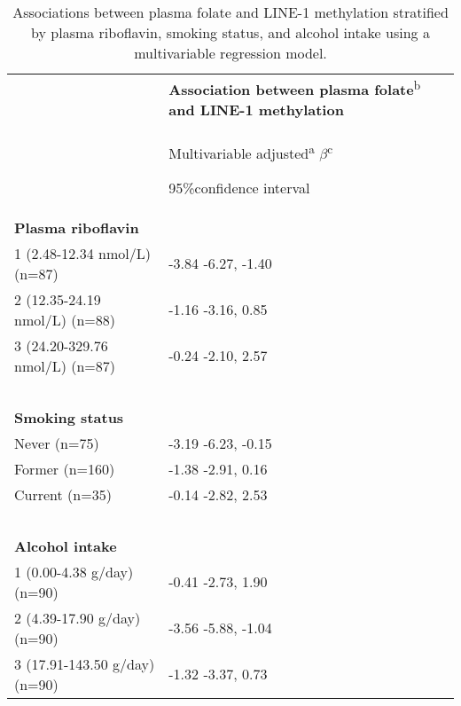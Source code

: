 \begin{table}
\caption{Associations between plasma folate and LINE-1 methylation stratified by plasma riboflavin, smoking status, and alcohol intake using a multivariable regression model.}
\label{table5_5}
\begin{adjustbox}{width=\textwidth}
\begin{tabular}{L{5.5cm}C{6.5cm}}

\hline ~ & %
\textbf{Association between plasma folate}\textsuperscript{b}
\textbf{and LINE-1 methylation}\\
~ & { Multivariable adjusted\textsuperscript{a}}{ $\beta $\textsuperscript{c}}

 95\%confidence interval\\
\hline
\textbf{Plasma riboflavin} & ~ \\
1 (2.48-12.34 nmol/L) (n=87) & { {}-3.84} {}-6.27, -1.40\\
2 (12.35-24.19 nmol/L) (n=88) & { {}-1.16} {}-3.16, 0.85\\
3 (24.20-329.76 nmol/L) (n=87) & { {}-0.24} {}-2.10, 2.57\\
~ & ~ \\
\textbf{Smoking status} & ~ \\
Never (n=75) & { {}-3.19} {}-6.23, -0.15\\
Former (n=160) & { {}-1.38} {}-2.91, 0.16\\
Current (n=35) & { {}-0.14} {}-2.82, 2.53\\
~ & ~ \\
\textbf{Alcohol intake} & ~ \\
1 (0.00-4.38 g/day) (n=90) & { {}-0.41} {}-2.73, 1.90\\
2 (4.39-17.90 g/day) (n=90) & { {}-3.56} {}-5.88, -1.04\\
3 (17.91-143.50 g/day) (n=90) & { {}-1.32} {}-3.37, 0.73\\
\hline
\end{tabular}
\end{adjustbox}
\end{table}


